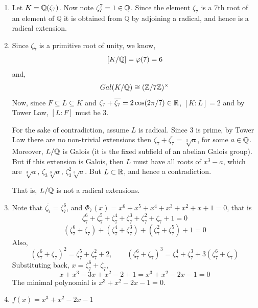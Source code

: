 \documentclass[12pt]{article}
\begin{document}
\begin{solution}
    \bbni 
    \begin{enumerate}
        \item [(a)] Let $K = \mathbb Q(\zeta_7)$. Now note $\zeta_7^7 = 1 \in \mathbb Q$. Since the element $\zeta_7$ is a 7th root of an element of $\mathbb{Q}$ it is obtained from $\mathbb{Q}$ by adjoining a radical, and hence is a radical extension. 
        
        \item [(b)] Since $\zeta_7$ is a primitive root of unity, we know, 
        \[[K/\mathbb Q] = \varphi(7) = 6\]
        and, 
        \[Gal(K/\mathbb Q) \cong (\mathbb Z/7\mathbb Z)^\times\]
        Now, since $F \subseteq L \subseteq K$ and $\zeta_7 + \overline{\zeta_7} = 2\cos(2\pi/7) \in \mathbb R$, $[K:L] = 2$ and by Tower Law, $[L:F]$ must be $3$. 
        
        For the sake of contradiction, assume $L$ is radical. Since $3$ is prime, by Tower Law there are no non-trivial extensions then $\zeta_7+ \overline{\zeta_7} = \sqrt[3]{a}$, for some $a \in \mathbb Q$. 
        Moreover, $L/\mathbb Q$ is Galois (it is the fixed subfield of an abelian Galois group). But if this extension is Galois, then $L$ must have all roots of $x^3 - a$, which are $\sqrt[3]{a}, \,\zeta_3\sqrt[3]{a}, \, \zeta_3^2\sqrt[3]{a}$. But $L \subset \mathbb R$, and hence a contradiction.

        That is, $L/\mathbb Q$ is not a radical extensions.  

        \item [(c)] Note that $\overline{\zeta_7} = \zeta_7^6$, and $\Phi_7(x) = x^6 + x^5 + x^4 + x^3 + x^2 + x + 1 = 0$, that is 
        \[\zeta_7^6 + \zeta_7^5 + \zeta_7^4 + \zeta_7^3 + \zeta_7^2 + \zeta_7  + 1= 0 \]
        \[(\zeta_7^6 + \zeta_7) + (\zeta_7^4 + \zeta_7^3) + (\zeta_7^2 + \zeta_7^5)  + 1= 0 \]
        Also, 
        \[(\zeta_7^6 + \zeta_7)^2 = \zeta_7^5 + \zeta_7^2 + 2, \qquad (\zeta_7^6 + \zeta_7)^3 = \zeta_7^4 + \zeta_7^3 + 3(\zeta_7^6 + \zeta_7)\]
        Substituting back, $x = \zeta_7^6 + \zeta_7$, 
        \[x + x^3 - 3x + x^2 - 2  + 1 = x^3 + x^2 -2x -1= 0 \]
        The minimal polynomial is $x^3 + x^2 - 2x - 1 = 0$. 
        \item [(d)] $f(x) = x^3 + x^2 - 2x - 1$
    \end{enumerate}
\end{solution}

\newpage 
\end{document}
